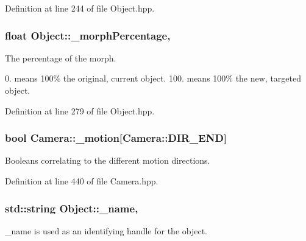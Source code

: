 Definition at line 244 of file Object.\-hpp.

\hypertarget{class_object_a7fbbac9027e1a8266342bd5ce064120d}{
\subsubsection[{\-\_\-morph\-Percentage}]{\setlength{\rightskip}{0pt plus 5cm}float Object\-::\-\_\-morph\-Percentage\hspace{0.3cm}{\ttfamily [protected]}, {\ttfamily [inherited]}}}\label{class_object_a7fbbac9027e1a8266342bd5ce064120d}


The percentage of the morph. 

0. means 100\% the original, current object. 100. means 100\% the new, targeted object. 

Definition at line 279 of file Object.\-hpp.

\hypertarget{class_camera_abec7e2becbad5a692a54a69b6a5f6d75}{
\subsubsection[{\-\_\-motion}]{\setlength{\rightskip}{0pt plus 5cm}bool Camera\-::\-\_\-motion\mbox{[}Camera\-::\-D\-I\-R\-\_\-\-E\-N\-D\mbox{]}\hspace{0.3cm}{\ttfamily [private]}}}\label{class_camera_abec7e2becbad5a692a54a69b6a5f6d75}


Booleans correlating to the different motion directions. 



Definition at line 440 of file Camera.\-hpp.

\hypertarget{class_object_a3f617214b260ebbe394e7c7b08ab5e43}{
\subsubsection[{\-\_\-name}]{\setlength{\rightskip}{0pt plus 5cm}std\-::string Object\-::\-\_\-name\hspace{0.3cm}{\ttfamily [protected]}, {\ttfamily [inherited]}}}\label{class_object_a3f617214b260ebbe394e7c7b08ab5e43}


\-\_\-name is used as an identifying handle for the object. 



